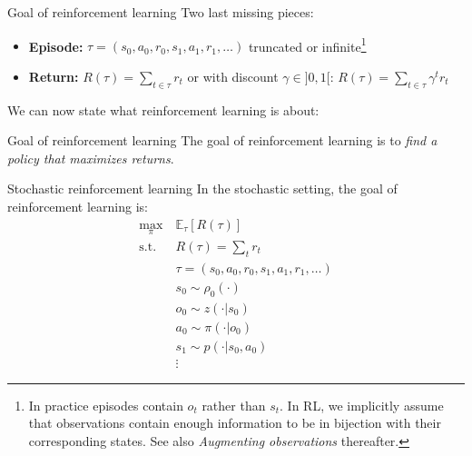 \documentclass[10pt, aspectratio=1610]{beamer}
\begin{document}
\begin{frame}{Goal of reinforcement learning}
    Two last missing pieces:
    \begin{itemize}
        \item \textbf{Episode:} $\tau = (s_0, a_0, r_0, s_1, a_1, r_1, \ldots)$ truncated or infinite\footnote{In practice episodes contain $o_t$ rather than $s_t$. In RL, we implicitly assume that observations contain enough information to be in bijection with their corresponding states. See also \emph{Augmenting observations} thereafter.}
        \item \textbf{Return:} $R(\tau) = \sum_{t \in \tau} r_t$ or with discount $\gamma \in ]0, 1[$: $R(\tau) = \sum_{t \in \tau} \gamma^t r_t$
    \end{itemize}
    We can now state what reinforcement learning is about:

    \vspace{1ex}
    \begin{block}{Goal of reinforcement learning}
        The goal of reinforcement learning is to \emph{find a policy that maximizes returns}.
    \end{block}
\end{frame}

\begin{frame}{Stochastic reinforcement learning}
    In the stochastic setting, the goal of reinforcement learning is:
    \begin{align*}
        \max_{\pi} \ & \mathbb{E}_{\tau} [R(\tau)] \\
        \mathrm{s.t.} \
        & R(\tau) = \textstyle \sum_t r_t \\
        & \tau = (s_0, a_0, r_0, s_1, a_1, r_1, \ldots) \\
        & s_0 \sim \rho_0(\cdot) \\
        & o_0 \sim z(\cdot | s_0) \\
        & a_0 \sim \pi(\cdot | o_0) \\
        & s_1 \sim p(\cdot | s_0, a_0) \\
        & \vdots
    \end{align*}
\end{frame}
\end{document}
